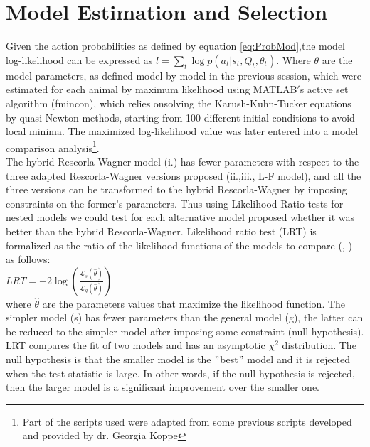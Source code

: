\section{Model Estimation and Selection}
\label{sec:Behavior}
Given the action probabilities as defined by equation \ref{eq:ProbMod},the model log-likelihood can be expressed as $l=\sum_{t} \log p(a_t|s_t,Q_t,\theta_t)$. Where $\theta$ are the model parameters, as defined model by model in the previous session, which were estimated for each animal by maximum likelihood using MATLAB$'$s active set algorithm (fmincon), which relies onsolving the Karush-Kuhn-Tucker equations by quasi-Newton methods, starting from 100 different initial conditions to avoid local minima. The maximized log-likelihood value was later entered into a model comparison analysis\footnote{Part of the scripts used were adapted from some previous scripts developed and provided by dr. Georgia Koppe}.\\
The hybrid Rescorla-Wagner model (i.) has fewer parameters with respect to the three adapted Rescorla-Wagner versions proposed (ii.,iii., L-F model), and all the three versions can be transformed to the hybrid Rescorla-Wagner by imposing constraints on the former's parameters. Thus using Likelihood Ratio tests for nested models we could test for each alternative model proposed whether it was better than the hybrid Rescorla-Wagner. Likelihood ratio test (LRT) is formalized as the ratio of the likelihood functions of the models to compare (\cite{NeymanPearson}, \cite{King}) as follows:\\
 \hspace{5cm} $LRT = -2 \log (\frac{\mathcal{L}_s(\hat{\theta})}{\mathcal{L}_g(\hat{\theta})})$\\
where $\hat{\theta}$ are the parameters values that maximize the likelihood function.
The simpler model (s) has fewer parameters than the general model (g), the latter can be reduced to the simpler model after imposing some constraint (null hypothesis).\\
LRT compares the fit of two models and has an asymptotic $\chi^2$ distribution. The null hypothesis is that the smaller model is the $"$best$"$ model and it is rejected when the test statistic is large. In other words, if the null hypothesis is rejected, then the larger model is a significant improvement over the smaller one.\\
